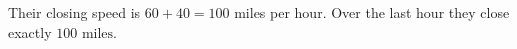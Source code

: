 Their closing speed is $60+40=100$ miles per hour. Over the last hour they close exactly $\boxed{100\text{ miles}}$.
